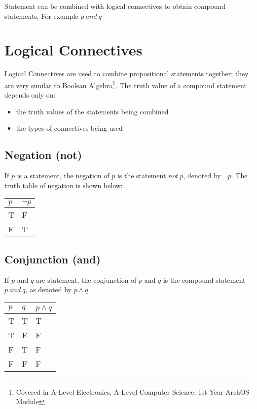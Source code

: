 Statement can be combined with logical connectives to obtain compound statements. For example $p\ and\ q$

\section{Logical Connectives}
Logical Connectives are used to combine propositional statements together; they are very similar to Boolean Algebra\footnote{Covered in A-Level Electronics, A-Level Computer Science, 1st Year ArchOS Module}. The truth value of a compound statement depends only on:
\begin{itemize}
    \item the truth values of the statements being combined
    \item the types of connectives being used
\end{itemize}

\subsection{Negation (not)}
If $p$ is a statement, the negation of $p$ is the statement $not\ p$, denoted by $¬p$. The truth table of negation is shown below:
\begin{table}[H]
    \centering
    \begin{tabular}{C{0.1\textwidth} C{0.1\textwidth}}
        \textbf{$p$} & \textbf{$¬p$}\\
        \hline
        \hline
        T & F \\
        \hline
        F & T \\
        \hline
    \end{tabular}
\end{table}

\subsection{Conjunction (and)}
If $p$ and $q$ are statement, the conjunction of $p$ and $q$ is the compound statement $p\ and\ q$, as denoted by $p \wedge q$
\begin{table}[H]
    \centering
    \begin{tabular}{C{0.1\textwidth} C{0.1\textwidth} C{0.1\textwidth}}
        $p$ & $q$ & $p \wedge q$\\
        \hline
        \hline
        T & T & T\\
        \hline
        T & F & F \\
        \hline
        F & T & F \\
        \hline
        F & F & F\\
        \hline
    \end{tabular}
\end{table}

